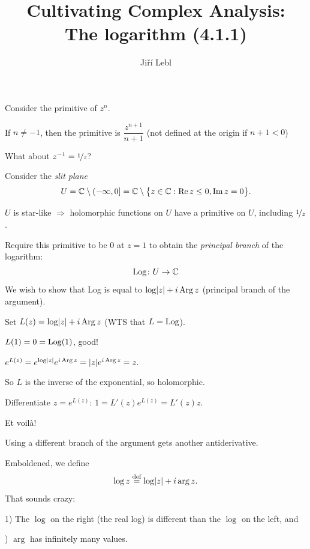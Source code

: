 \documentclass[10pt,aspectratio=169]{beamer}
\author{Ji\v{r}\'i Lebl}
\institute[OSU]{%
Departemento pri Matematiko de Oklahoma {\^S}tata Universitato}
\title{Cultivating Complex Analysis:\\%
The logarithm (4.1.1)}
\date{}
\begin{document}
\begin{frame}
\titlepage
\end{frame}

\begin{frame}
Consider the primitive of $z^n$.

\medskip
\pause

If $n\not=-1$, then the primitive is 
$\dfrac{z^{n+1}}{n+1}$ (not defined at the origin if $n+1 < 0$)

\medskip
\pause

What about $z^{-1} = \nicefrac{1}{z}$?

\medskip
\pause

Consider the \emph{slit plane}
\[
U = {\mathbb{C}} \setminus (-\infty,0] = {\mathbb{C}} \setminus \bigl\{ z \in {\mathbb{C}} : \operatorname{Re} z \leq 0 , \operatorname{Im} z = 0 \bigr\}.
\]

\pause

$U$ is star-like $\Rightarrow$ holomorphic functions on $U$ have a primitive on
$U$, including $\nicefrac{1}{z}$.

\medskip
\pause

Require this primitive to be $0$ at $z=1$ to obtain
the \emph{principal branch} of the logarithm:
\[
\operatorname{Log} \colon U \to {\mathbb{C}} 
\]
\pause
We wish to show that Log is equal to
$\log \lvert {z} \rvert + i \operatorname{Arg} z$ (principal branch of the argument).
\end{frame}

\begin{frame}
Set $L(z) = \log \lvert {z} \rvert + i \operatorname{Arg} z$ \qquad (WTS that $L = \operatorname{Log}$).

\medskip
\pause

$L(1) = 0 = \operatorname{Log}(1)$, good!

\medskip
\pause

$
e^{L(z)}
=
e^{\log \lvert {z} \rvert} e^{i \operatorname{Arg} z}
=
\lvert {z} \rvert e^{i \operatorname{Arg} z} = z .
$

\pause
\medskip

So $L$ is the inverse of the exponential, so holomorphic.

\medskip
\pause
Differentiate $z = e^{L(z)}$:
\qquad
\pause
$
1 = L'(z) e^{L(z)} = L'(z) z .
$

\medskip
\pause
Et voil\`a!

\medskip
\pause

Using a different branch of the argument gets another antiderivative.

\medskip
\pause

Emboldened, we define
\[
\log z \overset{\text{def}}{=} \log \lvert {z} \rvert + i \arg z .
\]
\pause
That sounds crazy: \pause

1) The $\log$ on the right (the real log) is different than the $\log$ on
the left, and

) $\arg$ has infinitely many values.
\end{frame}
\end{document}

